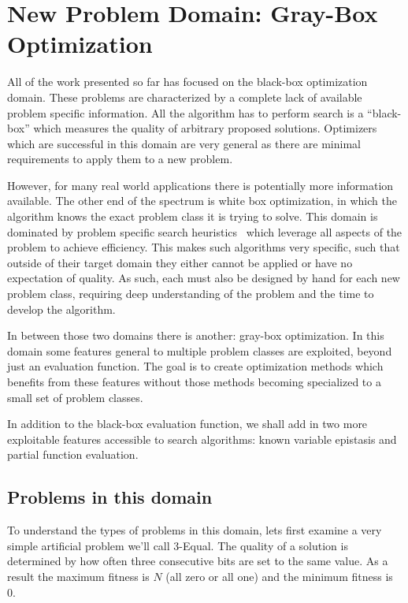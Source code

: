 \chapter{New Problem Domain: Gray-Box Optimization}
\label{chap-graybox}
All of the work presented so far has focused on the black-box optimization
domain. These problems are characterized by a complete lack of available
problem specific information. All the algorithm has to perform search
is a ``black-box'' which measures the quality of arbitrary proposed
solutions. Optimizers which are successful in this domain are very general
as there are minimal requirements to apply them to a new problem.

However, for many real world applications there is potentially more information
available. The other end of the spectrum is white box optimization, in which
the algorithm knows the exact problem class it is trying to solve. This domain
is dominated by problem specific search
heuristics~\cite{een:2004:satsolver,sherrington:1975:isingsolver,wright:2000:solvingnk} which
leverage all aspects of the problem to achieve efficiency. This makes such
algorithms very specific, such that outside of their target domain they
either cannot be applied or have no expectation of quality. As such,
each must also be designed by hand for each new problem class, requiring
deep understanding of the problem and the time to develop the algorithm.

In between those two domains there is another: gray-box optimization. In this
domain some features general to multiple problem classes are exploited, beyond
just an evaluation function. The goal is to create optimization methods which
benefits from these features without those methods becoming specialized to
a small set of problem classes.

In addition to the black-box evaluation function, we shall
add in two more exploitable features accessible to search algorithms:
known variable epistasis and partial function evaluation.

\section{Problems in this domain}
To understand the types of problems in this domain, lets first examine
a very simple artificial problem we'll call 3-Equal. The quality
of a solution is determined by how often three consecutive bits are set
to the same value. As a result the maximum fitness is $N$ (all zero or all one) and the minimum fitness
is 0.

